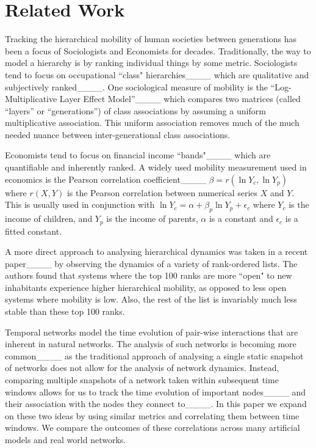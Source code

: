 \section{Related Work}
\label{sec:related_work}
Tracking the hierarchical mobility of human societies between generations has been a focus of Sociologists and Economists for decades. Traditionally, the way to model a hierarchy is by ranking individual things by some metric. Sociologists tend to focus on occupational ``class" hierarchies____ which are qualitative and subjectively ranked____. One sociological measure of mobility is the ``Log-Multiplicative Layer Effect Model''____ which compares two matrices (called ``layers'' or ``generations'') of class associations by assuming a uniform multiplicative association. This uniform association removes much of the much needed nuance between inter-generational class associations. 

Economists tend to focus on financial income ``bands"____ which are quantifiable and inherently ranked. A widely used mobility measurement used in economics is the Pearson correlation coefficient____
$\beta = r(\ln{Y_c},\ln{Y_p})$
where $r(X,Y)$ is the Pearson correlation between numerical series $X$ and $Y$. This is usually used in conjunction with
$\ln{Y_c} = \alpha + \beta_p\ln{Y_p} + \epsilon_c$
where $Y_c$ is the income of children, and $Y_p$ is the income of parents, $\alpha$ is a constant and $\epsilon_c$ is a fitted constant. 

A more direct approach to analysing hierarchical dynamics was taken in a recent paper____ by observing the dynamics of a variety of rank-ordered lists. The authors found that systems where the top 100 ranks are more ``open" to new inhabitants experience higher hierarchical mobility, as opposed to less open systems where mobility is low. Also, the rest of the list is invariably much less stable than these top 100 ranks.

Temporal networks model the time evolution of pair-wise interactions that are inherent in natural networks. The analysis of such networks is becoming more common____ as the traditional approach of analysing a single static snapshot of networks does not allow for the analysis of network dynamics. Instead, comparing multiple snapshots of a network taken within subsequent time windows allows for us to track the time evolution of important nodes____ and their association with the nodes they connect to____. In this paper we expand on these two ideas by using similar metrics and correlating them between time windows. We compare the outcomes of these correlations across many artificial models and real world networks.

